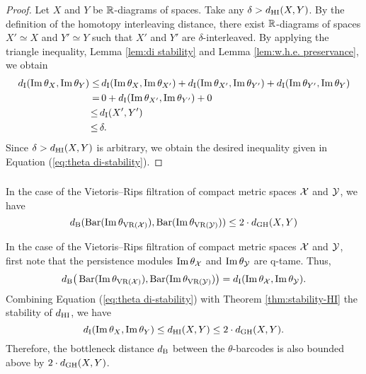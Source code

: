 \begin{proof}
    Let $X$ and $Y$ be $\mathbb{R}$-diagrams of spaces. 
    Take any $\delta > d_{\mathrm{HI}}(X,Y)$.
    By the definition of the homotopy interleaving distance, there exist $\mathbb{R}$-diagrams of spaces $X' \simeq X$ and $Y' \simeq Y$ such that $X'$ and $Y'$ are $\delta$-interleaved.
    By applying the triangle inequality, Lemma \ref{lem:di stability} and Lemma \ref{lem:w.h.e. preservance}, we obtain
    \begin{align*}
        d_{\mathrm{I}}(\operatorname{Im}\theta_{X}, \operatorname{Im}\theta_{Y}) \leq& \,
        d_{\mathrm{I}}(\operatorname{Im}\theta_{X}, \operatorname{Im}\theta_{X'}) + d_{\mathrm{I}}(\operatorname{Im}\theta_{X'}, \operatorname{Im}\theta_{Y'}) + d_{\mathrm{I}}(\operatorname{Im}\theta_{Y'}, \operatorname{Im}\theta_{Y}) \\ =& \, 
        0 + d_{\mathrm{I}}(\operatorname{Im}\theta_{X'}, \operatorname{Im}\theta_{Y'}) + 0 \\ \leq \,&
        d_{\mathrm{I}}(X',Y') \\ \leq \,&
        \delta.
    \end{align*}
    Since $\delta > d_{\mathrm{HI}}(X,Y)$ is arbitrary, we obtain the desired inequality given in Equation (\ref{eq:theta di-stability}).
\end{proof}

\subsubsection{}
\corollary
In the case of the Vietoris--Rips filtration of compact metric spaces $\mathcal{X}$ and $\mathcal{Y}$, we have
\[
d_{\mathrm{B}}(\operatorname{Bar}(\operatorname{Im} \theta_{\operatorname{VR}(\mathcal{X})}), \operatorname{Bar}(\operatorname{Im} \theta_{\operatorname{VR}(\mathcal{Y})})) \leq 2 \cdot d_{\mathrm{GH}}(X,Y)
\]


In the case of the Vietoris--Rips filtration of compact metric spaces $\mathcal{X}$ and $\mathcal{Y}$, first note that the persistence modules $\operatorname{Im}\theta_{\mathcal{X}}$ and $\operatorname{Im}\theta_{\mathcal{Y}}$ are q-tame.
Thus,
\[
d_{\mathrm{B}}\big(\operatorname{Bar}(\operatorname{Im} \theta_{\operatorname{VR}(\mathcal{X})}), \operatorname{Bar}(\operatorname{Im} \theta_{\operatorname{VR}(\mathcal{Y})})\big) =
d_{\mathrm{I}}(\operatorname{Im}\theta_{\mathcal{X}}, \operatorname{Im}\theta_{\mathcal{Y}}).
\]
Combining Equation (\ref{eq:theta di-stability}) with Theorem \ref{thm:stability-HI} the stability of $d_{\mathrm{HI}}$, we have
\[
d_{\mathrm{I}}(\operatorname{Im}\theta_{X}, \operatorname{Im}\theta_{Y}) \leq
d_{\mathrm{HI}}(X,Y)\leq 2\cdot d_{\mathrm{GH}}(X,Y).
\]
Therefore, the bottleneck distance $d_{\mathrm{B}}$ between the $\theta$-barcodes is also bounded above by $2\cdot d_{\mathrm{GH}}(X,Y)$.